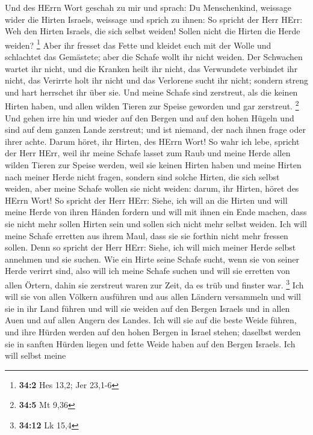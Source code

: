 Und des HErrn Wort geschah zu mir und sprach:  Du
Menschenkind, weissage wider die Hirten Israels, weissage und sprich zu
ihnen: So spricht der Herr HErr: Weh den Hirten Israels, die sich selbst
weiden! Sollen nicht die Hirten die Herde weiden? \footnote{\textbf{34:2}
  Hes 13,2; Jer 23,1-6}  Aber ihr fresset das Fette und
kleidet euch mit der Wolle und schlachtet das Gemästete; aber die Schafe
wollt ihr nicht weiden.  Der Schwachen wartet ihr nicht, und
die Kranken heilt ihr nicht, das Verwundete verbindet ihr nicht, das
Verirrte holt ihr nicht und das Verlorene sucht ihr nicht; sondern
streng und hart herrschet ihr über sie.  Und meine Schafe
sind zerstreut, als die keinen Hirten haben, und allen wilden Tieren zur
Speise geworden und gar zerstreut. \footnote{\textbf{34:5} Mt 9,36}
 Und gehen irre hin und wieder auf den Bergen und auf den
hohen Hügeln und sind auf dem ganzen Lande zerstreut; und ist niemand,
der nach ihnen frage oder ihrer achte.  Darum höret, ihr
Hirten, des HErrn Wort!  So wahr ich lebe, spricht der Herr
HErr, weil ihr meine Schafe lasset zum Raub und meine Herde allen wilden
Tieren zur Speise werden, weil sie keinen Hirten haben und meine Hirten
nach meiner Herde nicht fragen, sondern sind solche Hirten, die sich
selbst weiden, aber meine Schafe wollen sie nicht weiden: 
darum, ihr Hirten, höret des HErrn Wort!  So spricht der
Herr HErr: Siehe, ich will an die Hirten und will meine Herde von ihren
Händen fordern und will mit ihnen ein Ende machen, dass sie nicht mehr
sollen Hirten sein und sollen sich nicht mehr selbst weiden. Ich will
meine Schafe erretten aus ihrem Maul, dass sie sie forthin nicht mehr
fressen sollen.  Denn so spricht der Herr HErr: Siehe, ich
will mich meiner Herde selbst annehmen und sie suchen.  Wie
ein Hirte seine Schafe sucht, wenn sie von seiner Herde verirrt sind,
also will ich meine Schafe suchen und will sie erretten von allen
Örtern, dahin sie zerstreut waren zur Zeit, da es trüb und finster war.
\footnote{\textbf{34:12} Lk 15,4}  Ich will sie von allen
Völkern ausführen und aus allen Ländern versammeln und will sie in ihr
Land führen und will sie weiden auf den Bergen Israels und in allen Auen
und auf allen Angern des Landes.  Ich will sie auf die
beste Weide führen, und ihre Hürden werden auf den hohen Bergen in
Israel stehen; daselbst werden sie in sanften Hürden liegen und fette
Weide haben auf den Bergen Israels.  Ich will selbst meine

